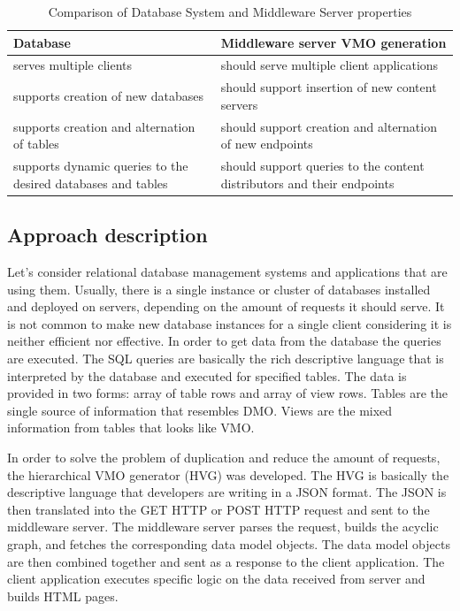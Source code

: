 \begin{table}
\begin{center}
  \begin{tabular}{||p{3in}|||p{3in}||}
    \hline
    Database & Middleware server VMO generation  \\ \hline
    serves multiple clients & should serve multiple client applications  \\ \hline
    supports creation of new databases & should support insertion of new content servers  \\ \hline
    supports creation and alternation of tables & should support creation and alternation of new endpoints  \\ \hline
    supports dynamic queries to the desired databases and tables & should support queries to the content distributors and their endpoints \\ \hline
    \hline
  \end{tabular}
  \caption{Comparison of Database System and Middleware Server properties}
  \label{table:db_ms}
\end{center}
\end{table}

\subsection{Approach description}

Let's consider relational database management systems and applications that are using them. Usually, there is a single instance or cluster of databases installed and deployed on servers, depending on the amount of requests it should serve. It is not common to make new database instances for a single client considering it is neither efficient nor effective. In order to get data from the database the queries are executed. The SQL queries are basically the rich descriptive language that is interpreted by the database and executed for specified tables. The data is provided in two forms: array of table rows and array of view rows. Tables are the single source of information that resembles DMO. Views are the mixed information from tables that looks like VMO. 

In order to solve the problem of duplication and reduce the amount of requests, the hierarchical VMO generator (HVG) was developed. The HVG is basically the descriptive language that developers are writing in a JSON format. The JSON is then translated into the GET HTTP or POST HTTP request and sent to the middleware server. The middleware server parses the request, builds the acyclic graph, and fetches the corresponding data model objects. The data model objects are then combined together and sent as a response to the client application. The client application executes specific logic on the data received from server and builds HTML pages.


